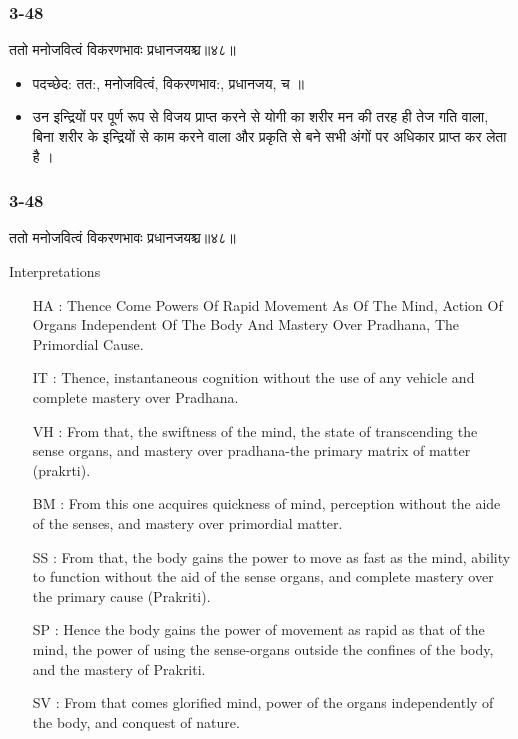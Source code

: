 \begin{frame}[fragile]\frametitle{3-48}
\begin{sanskrit}
ततो मनोजवित्वं विकरणभावः प्रधानजयश्च॥४८॥
\end{sanskrit}

\begin{itemize}
\item पदच्छेद:  तत:, मनोजवित्वं, विकरणभाव:, प्रधानजय, च ॥
\item  उन इन्द्रियों पर पूर्ण रूप से विजय प्राप्त करने से योगी का शरीर मन की तरह ही तेज गति वाला, बिना शरीर के इन्द्रियों से काम करने वाला और प्रकृति से बने सभी अंगों पर अधिकार प्राप्त कर लेता है ।
\end{itemize}
\end{frame}

\begin{frame}[fragile]\frametitle{3-48}
\begin{sanskrit}
ततो मनोजवित्वं विकरणभावः प्रधानजयश्च॥४८॥
\end{sanskrit}

Interpretations
\begin{itemize}	
\item [HA]: Thence Come Powers Of Rapid Movement As Of The Mind, Action Of Organs Independent Of The Body And Mastery Over Pradhana, The Primordial Cause.
\item [IT]: Thence, instantaneous cognition without the use of any vehicle and complete mastery over Pradhana.		
\item [VH]: From that, the swiftness of the mind, the state of transcending the sense organs, and mastery over pradhana-the primary matrix of matter (prakrti).
\item [BM]: From this one acquires quickness of mind, perception without the aide of the senses, and mastery over primordial matter.
\item [SS]: From that, the body gains the power to move as fast as the mind, ability to function without the aid of the sense organs, and complete mastery over the primary cause (Prakriti).
\item [SP]: Hence the body gains the power of movement as rapid as that of the mind, the power of using the sense-organs outside the confines of the body, and the mastery of Prakriti.
\item [SV]: From that comes glorified mind, power of the organs independently of the body, and conquest of nature. 
\end{itemize}
\end{frame}


